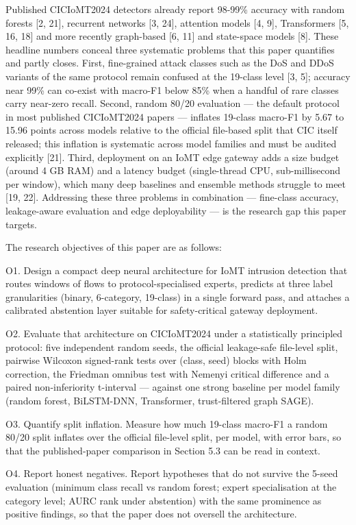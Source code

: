 \documentclass[11pt]{article}
\begin{document}
Published CICIoMT2024 detectors already report 98-99\% accuracy with random forests [2, 21], recurrent networks [3, 24], attention models [4, 9], Transformers [5, 16, 18] and more recently graph-based [6, 11] and state-space models [8]. These headline numbers conceal three systematic problems that this paper quantifies and partly closes. First, fine-grained attack classes such as the DoS and DDoS variants of the same protocol remain confused at the 19-class level [3, 5]; accuracy near 99\% can co-exist with macro-F1 below 85\% when a handful of rare classes carry near-zero recall. Second, random 80/20 evaluation --- the default protocol in most published CICIoMT2024 papers --- inflates 19-class macro-F1 by 5.67 to 15.96 points across models relative to the official file-based split that CIC itself released; this inflation is systematic across model families and must be audited explicitly [21]. Third, deployment on an IoMT edge gateway adds a size budget (around 4 GB RAM) and a latency budget (single-thread CPU, sub-millisecond per window), which many deep baselines and ensemble methods struggle to meet [19, 22]. Addressing these three problems in combination --- fine-class accuracy, leakage-aware evaluation and edge deployability --- is the research gap this paper targets.

The research objectives of this paper are as follows:

O1. Design a compact deep neural architecture for IoMT intrusion detection that routes windows of flows to protocol-specialised experts, predicts at three label granularities (binary, 6-category, 19-class) in a single forward pass, and attaches a calibrated abstention layer suitable for safety-critical gateway deployment.

O2. Evaluate that architecture on CICIoMT2024 under a statistically principled protocol: five independent random seeds, the official leakage-safe file-level split, pairwise Wilcoxon signed-rank tests over (class, seed) blocks with Holm correction, the Friedman omnibus test with Nemenyi critical difference and a paired non-inferiority t-interval --- against one strong baseline per model family (random forest, BiLSTM-DNN, Transformer, trust-filtered graph SAGE).

O3. Quantify split inflation. Measure how much 19-class macro-F1 a random 80/20 split inflates over the official file-level split, per model, with error bars, so that the published-paper comparison in Section 5.3 can be read in context.

O4. Report honest negatives. Report hypotheses that do not survive the 5-seed evaluation (minimum class recall vs random forest; expert specialisation at the category level; AURC rank under abstention) with the same prominence as positive findings, so that the paper does not oversell the architecture.
\end{document}
